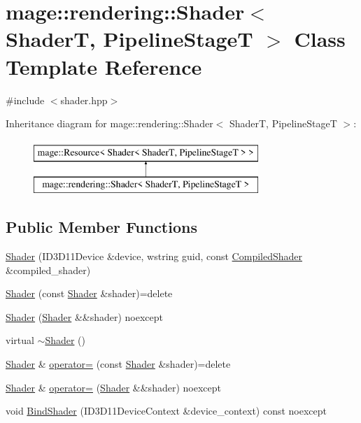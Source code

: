 \hypertarget{classmage_1_1rendering_1_1_shader}{}\section{mage\+:\+:rendering\+:\+:Shader$<$ ShaderT, Pipeline\+StageT $>$ Class Template Reference}
\label{classmage_1_1rendering_1_1_shader}


{\ttfamily \#include $<$shader.\+hpp$>$}

Inheritance diagram for mage\+:\+:rendering\+:\+:Shader$<$ ShaderT, Pipeline\+StageT $>$\+:\begin{figure}[H]
\begin{center}
\leavevmode
\includegraphics[height=2.000000cm]{classmage_1_1rendering_1_1_shader}
\end{center}
\end{figure}
\subsection*{Public Member Functions}
\begin{DoxyCompactItemize}
\item 
\mbox{\hyperlink{classmage_1_1rendering_1_1_shader_a00fe99edc760763ede9dd414b286c820}{Shader}} (I\+D3\+D11\+Device \&device, wstring guid, const \mbox{\hyperlink{classmage_1_1rendering_1_1_compiled_shader}{Compiled\+Shader}} \&compiled\+\_\+shader)
\item 
\mbox{\hyperlink{classmage_1_1rendering_1_1_shader_a4ca3a1e4f108e38d28c0ba3df4f234f6}{Shader}} (const \mbox{\hyperlink{classmage_1_1rendering_1_1_shader}{Shader}} \&shader)=delete
\item 
\mbox{\hyperlink{classmage_1_1rendering_1_1_shader_a65ecc5e4958ce06d7dfa8632dccc774f}{Shader}} (\mbox{\hyperlink{classmage_1_1rendering_1_1_shader}{Shader}} \&\&shader) noexcept
\item 
virtual \mbox{\hyperlink{classmage_1_1rendering_1_1_shader_af9774a6a1f073f0477c5f4e35f130181}{$\sim$\+Shader}} ()
\item 
\mbox{\hyperlink{classmage_1_1rendering_1_1_shader}{Shader}} \& \mbox{\hyperlink{classmage_1_1rendering_1_1_shader_a66253b5dd8a5ef1cd766512b4ab15e6c}{operator=}} (const \mbox{\hyperlink{classmage_1_1rendering_1_1_shader}{Shader}} \&shader)=delete
\item 
\mbox{\hyperlink{classmage_1_1rendering_1_1_shader}{Shader}} \& \mbox{\hyperlink{classmage_1_1rendering_1_1_shader_a940217c505f3994d1f6057345d52cb36}{operator=}} (\mbox{\hyperlink{classmage_1_1rendering_1_1_shader}{Shader}} \&\&shader) noexcept
\item 
void \mbox{\hyperlink{classmage_1_1rendering_1_1_shader_abb37464c991b9b49e94c93968e884f13}{Bind\+Shader}} (I\+D3\+D11\+Device\+Context \&device\+\_\+context) const noexcept
\end{DoxyCompactItemize}
